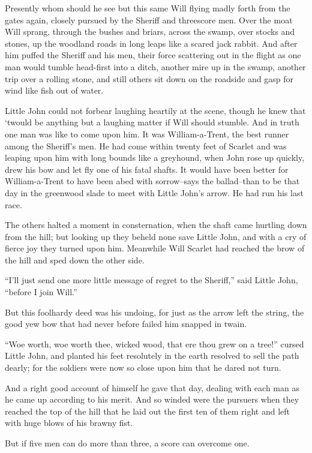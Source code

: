 Presently whom should he see but this same Will flying madly forth from
the gates again, closely pursued by the Sheriff and threescore men. Over
the moat Will sprang, through the bushes and briars, across the swamp,
over stocks and stones, up the woodland roads in long leaps like a
scared jack rabbit. And after him puffed the Sheriff and his men, their
force scattering out in the flight as one man would tumble head-first
into a ditch, another mire up in the swamp, another trip over a rolling
stone, and still others sit down on the roadside and gasp for wind like
fish out of water.

Little John could not forbear laughing heartily at the scene, though he
knew that `twould be anything but a laughing matter if Will should
stumble. And in truth one man was like to come upon him. It was
William-a-Trent, the best runner among the Sheriff's men. He had come
within twenty feet of Scarlet and was leaping upon him with long bounds
like a greyhound, when John rose up quickly, drew his bow and let fly
one of his fatal shafts. It would have been better for William-a-Trent
to have been abed with sorrow--says the ballad--than to be that day in
the greenwood slade to meet with Little John's arrow. He had run his
last race.

The others halted a moment in consternation, when the shaft came
hurtling down from the hill; but looking up they beheld none save Little
John, and with a cry of fierce joy they turned upon him. Meanwhile Will
Scarlet had reached the brow of the hill and sped down the other side.

``I'll just send one more little message of regret to the Sheriff,''
said Little John, ``before I join Will.''

But this foolhardy deed was his undoing, for just as the arrow left the
string, the good yew bow that had never before failed him snapped in
twain.

``Woe worth, woe worth thee, wicked wood, that ere thou grew on a
tree!'' cursed Little John, and planted his feet resolutely in the earth
resolved to sell the path dearly; for the soldiers were now so close
upon him that he dared not turn.

And a right good account of himself he gave that day, dealing with each
man as he came up according to his merit. And so winded were the
pursuers when they reached the top of the hill that he laid out the
first ten of them right and left with huge blows of his brawny fist.

But if five men can do more than three, a score can overcome one.

